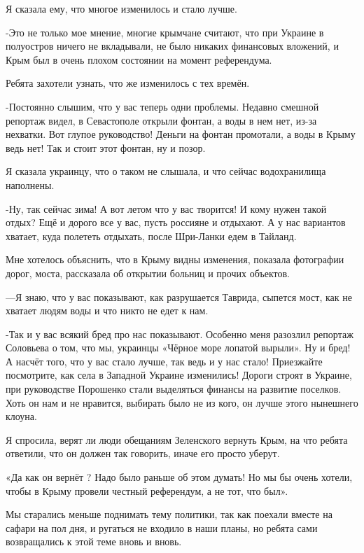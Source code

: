 Я сказала ему, что многое изменилось и стало лучше. 

-Это не только мое мнение, многие крымчане считают, что при Украине в
полуостров ничего не вкладывали, не было никаких финансовых вложений, и Крым
был в очень плохом состоянии на момент референдума.

Ребята захотели узнать, что же изменилось с тех времён.

-Постоянно слышим, что у вас теперь одни проблемы. Недавно смешной репортаж
видел, в Севастополе открыли фонтан, а воды в нем нет, из-за нехватки. Вот
глупое руководство! Деньги на фонтан промотали, а воды в Крыму ведь нет! Так и
стоит этот фонтан, ну и позор.

Я сказала украинцу, что о таком не слышала, и что сейчас водохранилища
наполнены.

-Ну, так сейчас зима! А вот летом что у вас творится! И кому нужен такой отдых?
Ещё и дорого все у вас, пусть россияне и отдыхают. А у нас вариантов хватает,
куда полететь отдыхать, после Шри-Ланки едем в Тайланд. 

Мне хотелось объяснить, что в Крыму видны изменения, показала фотографии дорог,
моста, рассказала об открытии больниц и прочих объектов. 

—Я знаю, что у вас показывают, как разрушается Таврида, сыпется мост, как не
хватает людям воды и что никто не едет к нам. 

-Так и у вас всякий бред про нас показывают. Особенно меня разозлил репортаж
Соловьева о том, что мы, украинцы «Чёрное море лопатой вырыли». Ну и бред! А
насчёт того, что у вас стало лучше, так ведь и у нас стало! Приезжайте
посмотрите, как села в Западной Украине изменились! Дороги строят в Украине,
при руководстве Порошенко стали выделяться финансы на развитие поселков. Хоть
он нам и не нравится, выбирать было не из кого, он лучше этого нынешнего
клоуна.


Я спросила, верят ли люди обещаниям Зеленского вернуть Крым, на что ребята
ответили, что он должен так говорить, иначе его просто уберут.

«Да как он вернёт ? Надо было раньше об этом думать! Но мы бы очень хотели,
чтобы в Крыму провели честный референдум, а не тот, что был».

Мы старались меньше поднимать тему политики, так как поехали вместе на сафари
на пол дня, и ругаться не входило в наши планы, но ребята сами возвращались к
этой теме вновь и вновь.

